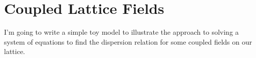 \documentclass[12pt]{article}
\begin{document}
\newcommand{\pder}[2]{\frac{\partial {#1}}{\partial {#2}}}
\newcommand{\pdert}[2]{\frac{\partial^2 {#1}}{\partial {#2}^2}}
\newcommand{\fder}[2]{\frac{\delta {#1}}{\delta {#2}}}
\newcommand{\PDD}[3]{\left.\frac{\partial^{2}{#1}}{\partial{#2}^{2}}\right|_{#3}
}
\newcommand{\PD}[3]{\left.\frac{\partial{#1}}{\partial{#2}}\right|_{#3}}
\newcommand{\der}[2]{\frac{d {#1}}{d {#2}}}
\newcommand{\pdder}[3]{\frac{\del^2 {#1}}{\del {#2} \del {#3}}}


\renewcommand{\deg}{^\circ}
\newcommand{\com}{{\bf [C] }}
\newcommand{\cend}{\Emark\[\]\vspace*{-1. cm}}
\newcommand{\x}{\times}

\newcommand{\win}{\ddot\smile}
\newcommand{\lose}{\ddot\frown}
\newcommand{\avg}[1]{\left \langle #1 \right \rangle}
\newcommand{\E}[1]{\ensuremath{\times10^{#1}}}
\newcommand{\abs}[1]{\ensuremath{\left | #1 \right |}}
\newcommand{\paren}[1]{\left(#1\right)}
\newcommand{\recip}[1]{\frac{1}{#1}}
\newcommand{\ex}[1]{\mathbb{E}[#1]}
\newcommand{\bprob}[1]{\textbf{#1~---}}
\newcommand{\unitv}[1]{\ensuremath{\mathbf{\hat{e}}_{#1}}}
\newcommand{\goto}{\rightarrow}
\newcommand{\expct}[1]{\mathbb{E}[#1]}
\newcommand{\mtrx}[1]{\begin{matrix}#1\end{matrix}}
\newcommand{\pmtrx}[1]{\paren{\begin{matrix}#1\end{matrix}}}
\newcommand{\cosp}[1]{\cos{\paren{#1}}}
\newcommand{\sinp}[1]{\sin{\paren{#1}}}
\newcommand{\tanp}[1]{\tan{\paren{#1}}}
\newcommand{\half}[1]{\frac{#1}{2}}
\newcommand{\ham}{\mathcal{H}}
\newcommand{\tr}{\mathrm{Tr}}
\newcommand{\bv}[1]{\mathbf{#1}}
\newcommand{\Der}[2]{\frac{d#1}{d#2}}
\renewcommand{\Dot}[2]{\ensuremath{\bv{#1}\cdot\bv{#2}}}
\newcommand{\Cross}[2]{\ensuremath{\bv{#1}\times\bv{#2}}}
\newcommand{\del}{\ensuremath{\partial}}
\newcommand{\R}{\ensuremath{\bv{r-r'}}}
\newcommand{\aR}{\ensuremath{\abs{\R}}}
\newcommand{\br}{\ensuremath{\bv{r}}}
\newcommand{\impl}{\ensuremath{\quad \Rightarrow \quad}}
\renewcommand{\div}[1]{\nabla \cdot \bv{#1}}
\newcommand{\curl}[1]{\nabla \times \bv{#1}}
\newcommand{\lapl}{\nabla^2}
\newcommand{\vint}{\int d^3r}
\newcommand{\oocs}{\recip{c^2}}
\newcommand{\mnfp}[1]{\frac{\mu_0 #1}{4\pi}}
\renewcommand{\iiint}{\int_{-\infty}^{\infty}}
\newcommand{\tpi}[1]{\paren{2\pi}^{#1}}
\newcommand{\ootpi}[1]{\recip{\paren{2\pi}^{#1}}}


\section{Coupled Lattice Fields}
I'm going to write a simple toy model to illustrate the approach to solving a system of equations to find the dispersion relation for some coupled fields on our lattice.
\end{document}
